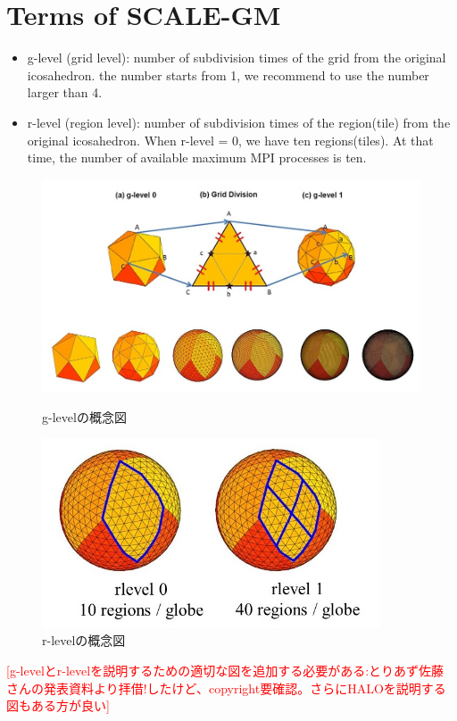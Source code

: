 \section{Terms of SCALE-GM}

 \begin{itemize}
   \item g-level (grid level): number of subdivision times of the grid from the original icosahedron.
         the number starts from 1, we recommend to use the number larger than 4.
   \item r-level (region level): number of subdivision times of the region(tile)
         from the original icosahedron. When r-level = 0, we have ten regions(tiles).
         At that time, the number of available maximum MPI processes is ten.
 \end{itemize}


\begin{figure}[h]
\centering
\includegraphics[width=15cm]{figure/g-level_concept.jpg}
\caption{g-levelの概念図}
\centering
\includegraphics[width=10cm]{figure/r-level_concept.jpg}
\caption{r-levelの概念図}
\end{figure}

\textcolor{red}{[g-levelとr-levelを説明するための適切な図を追加する必要がある:とりあず佐藤さんの発表資料より拝借!したけど、copyright要確認。さらにHALOを説明する図もある方が良い]}

